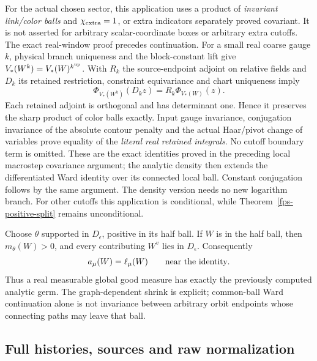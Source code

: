 \documentclass[11pt]{article}
\theoremstyle{remark}
\begin{document}
For the actual chosen sector, this application uses a product of
\emph{invariant link/color balls} and \(\chi_{\rm extra}=1\), or extra
indicators separately proved covariant. It is not asserted for arbitrary
scalar-coordinate boxes or arbitrary extra cutoffs. The exact real-window
proof precedes continuation. For a small real coarse gauge \(k\), physical
branch uniqueness and the block-constant lift give
\(V_*(W^k)=V_*(W)^{k^{\rm up}}\). With \(R_k\) the source-endpoint
adjoint on relative fields and \(D_k\) its retained restriction,
constraint equivariance and chart uniqueness imply
\[
 \Phi_{V_*(W^k)}(D_kz)=R_k\Phi_{V_*(W)}(z).
\]
Each retained adjoint is orthogonal and has determinant one. Hence it
preserves the sharp product of color balls exactly. Input gauge
invariance, conjugation invariance of the absolute contour penalty and
the actual Haar/pivot change of variables prove equality of the
\emph{literal real retained integrals}. No cutoff boundary term is
omitted. These are the exact identities proved in the preceding local
macrostep covariance argument; the analytic density then extends the
differentiated Ward identity over its connected local ball. Constant
conjugation follows by the same argument. The density version needs no
new logarithm branch. For other cutoffs this application is conditional,
while Theorem~\ref{fps-positive-split} remains unconditional.

Choose \(\theta\) supported in \(D_\epsilon\),
positive in its half ball. If \(W\) is in the half ball, then
\(m_\theta(W)>0\), and every contributing \(W^v\) lies in
\(D_\epsilon\). Consequently
\begin{equation}
 a_\mu(W)=\ell_\mu(W)\qquad\hbox{near the identity}.
 \label{fps-germ-equality}
\end{equation}
Thus a real measurable global good measure has exactly the previously
computed analytic germ. The graph-dependent shrink is explicit;
common-ball Ward continuation alone is not invariance between arbitrary
orbit endpoints whose connecting paths may leave that ball.

\subsection{Full histories, sources and raw normalization}
\label{fps-histories-section}
\end{document}
